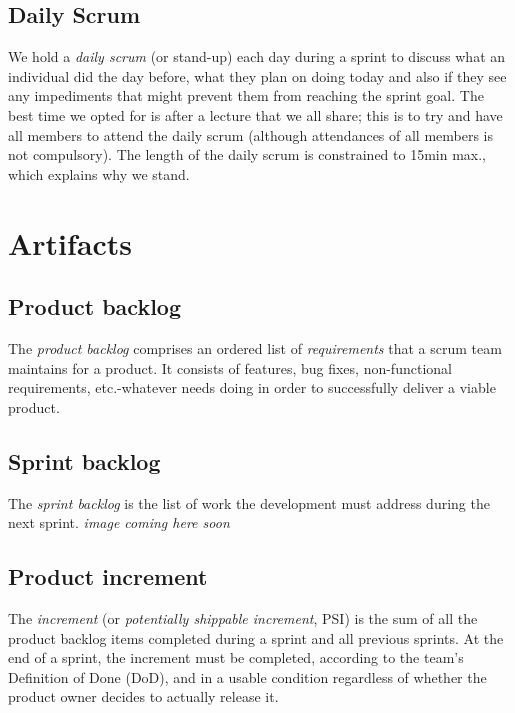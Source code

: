 \documentclass[hidelinks, 12pt, oneside]{article}
\begin{document}
	\subsection{Daily Scrum}
 	We hold a \emph{daily scrum} (or stand-up) each day during a sprint to discuss what an individual did the day before, what they plan on doing today and also if they 
 	see any impediments that might prevent them from reaching the sprint goal. The best time we opted for is after a lecture that we all share; this is to try and have 
 	all members	to attend the daily scrum (although attendances of all members is not compulsory). The length of the daily scrum is constrained to 15min max., which explains 
 	why we stand.\newpage 
 	
 	\section{Artifacts}
 	\subsection{Product backlog}
 	The \emph{product backlog} comprises an ordered list of \emph{requirements} that a scrum team maintains for a product. It consists of features, bug fixes, non-functional 
 	requirements, etc.-whatever needs doing in order to successfully deliver a viable product.
 	\subsection{Sprint backlog}
 	The \emph{sprint backlog} is the list of work the development must address during the next sprint.\newline\newline
 	\emph{image coming here soon}
 	\subsection{Product increment}
 	The \emph{increment} (or \emph{potentially shippable increment}, PSI) is the sum of all the product backlog items completed during a sprint and all previous sprints. At the end 
 	of a sprint, the increment must be completed, according to the team's Definition of Done (DoD), and in a usable condition regardless of whether the product owner decides to actually
 	release it.
\end{document}
